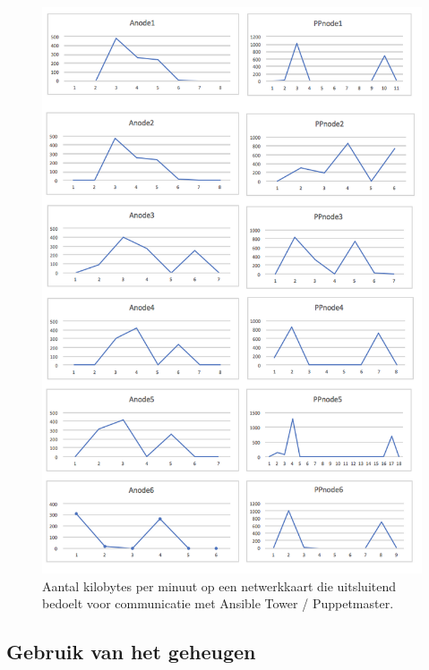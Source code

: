 \begin{figure}
  \includegraphics[width=\linewidth]{img/netwerkverbruikpernode.png}
 \caption{Aantal kilobytes per minuut op een netwerkkaart die uitsluitend bedoelt voor communicatie met Ansible Tower / Puppetmaster. }  
  \label{fig:netwerkverbruikpernode}
\end{figure}

\subsection{Gebruik van het geheugen}

